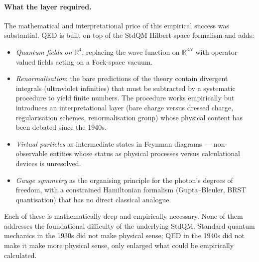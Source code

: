 \paragraph{What the layer required.}
The mathematical and interpretational price of this empirical success was substantial. QED is built on top of the StdQM Hilbert-space formalism and adds:
\begin{itemize}
\item \emph{Quantum fields on $\mathbb{R}^4$}, replacing the wave function on $\mathbb{R}^{3N}$ with operator-valued fields acting on a Fock-space vacuum.
\item \emph{Renormalisation}: the bare predictions of the theory contain divergent integrals (ultraviolet infinities) that must be subtracted by a systematic procedure to yield finite numbers. The procedure works empirically but introduces an interpretational layer (bare charge versus dressed charge, regularisation schemes, renormalisation group) whose physical content has been debated since the 1940s.
\item \emph{Virtual particles} as intermediate states in Feynman diagrams --- non-observable entities whose status as physical processes versus calculational devices is unresolved.
\item \emph{Gauge symmetry} as the organising principle for the photon's degrees of freedom, with a constrained Hamiltonian formalism (Gupta--Bleuler, BRST quantisation) that has no direct classical analogue.
\end{itemize}
Each of these is mathematically deep and empirically necessary. None of them addresses the foundational difficulty of the underlying StdQM. Standard quantum mechanics in the 1930s did not make physical sense; QED in the 1940s did not make it make more physical sense, only enlarged what could be empirically calculated.

